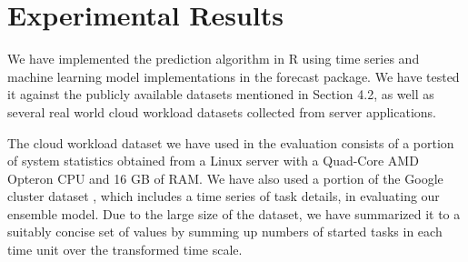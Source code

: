 
\section{Experimental Results}

We have implemented the prediction algorithm in R using time series and machine learning model implementations in the forecast package. We have tested it against the publicly available datasets mentioned in Section 4.2, as well as several real world cloud workload datasets \cite{AutoscaleAnalyser} collected from server applications.

The cloud workload dataset we have used in the evaluation consists of a portion of system statistics obtained from a Linux server with a Quad-Core AMD Opteron CPU and 16 GB of RAM. We have also used a portion of the Google cluster dataset \cite{GoogleClusterData}, which includes a time series of task details, in evaluating our ensemble model. Due to the large size of the dataset, we have summarized it to a suitably concise set of values by summing up numbers of started tasks in each time unit over the transformed time scale.

